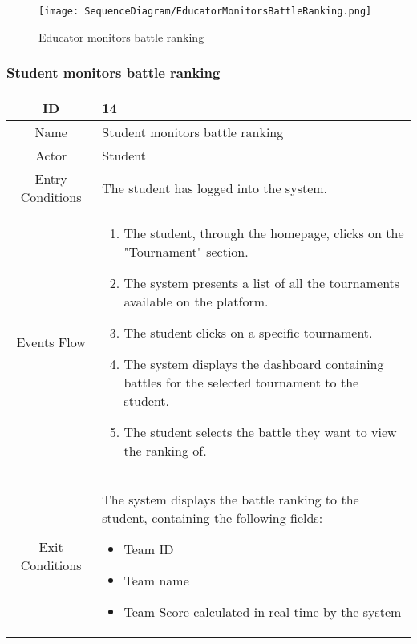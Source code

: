     \begin{figure}[H]
  \texttt{[image: SequenceDiagram/EducatorMonitorsBattleRanking.png]} 
  \caption{Educator monitors battle ranking}
  \label{fig:immagine}
\end{figure}

\newpage
\subsubsection{Student monitors battle ranking}

\begin{longtable}{|c| p{10cm}|}
    \hline
        ID & 14 \\
    \hline
        Name & Student monitors battle ranking \\
    \hline
        Actor & Student \\
    \hline
        Entry Conditions & 

                The student has logged into the system.
\\
    \hline
        Events Flow &   \begin{enumerate}
                            \item The student, through the homepage, clicks on the "Tournament" section.
                            \item The system presents a list of all the tournaments available on the platform.
                            \item The student clicks on a specific tournament.
                            \item The system displays the dashboard containing battles for the selected tournament to the student.
                            \item The student selects the battle they want to view the ranking of.
                        \end{enumerate} \\
    \hline
        Exit Conditions &

The system displays the battle ranking to the student, containing the following fields:
            \begin{itemize}
                                \item Team ID
                                \item Team name
                                \item Team Score calculated in real-time by the system
                            \end{itemize}
\\
    \hline
\end{longtable}

